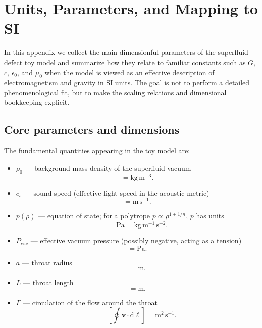 \documentclass[11pt]{article}
\newcommand{\dd}{\mathrm{d}}
\begin{document}
\section{Units, Parameters, and Mapping to SI}
\label{app:units}

In this appendix we collect the main dimensionful parameters of the superfluid defect toy model and summarize how they relate to familiar constants such as $G$, $c$, $\epsilon_0$, and $\mu_0$ when the model is viewed as an effective description of electromagnetism and gravity in SI units.  The goal is not to perform a detailed phenomenological fit, but to make the scaling relations and dimensional bookkeeping explicit.

\subsection{Core parameters and dimensions}

The fundamental quantities appearing in the toy model are:

\begin{itemize}
  \item $\rho_0$ --- background mass density of the superfluid vacuum
    \begin{equation}
    [\rho_0] = \mathrm{kg\,m^{-3}}.
    \end{equation}

  \item $c_s$ --- sound speed (effective light speed in the acoustic metric)
    \begin{equation}
    [c_s] = \mathrm{m\,s^{-1}}.
    \end{equation}

  \item $p(\rho)$ --- equation of state; for a polytrope $p \propto \rho^{1+1/n}$, $p$ has units
    \begin{equation}
    [p] = \mathrm{Pa} = \mathrm{kg\,m^{-1}\,s^{-2}}.
    \end{equation}

  \item $P_{\mathrm{vac}}$ --- effective vacuum pressure (possibly negative, acting as a tension)
    \begin{equation}
    [P_{\mathrm{vac}}] = \mathrm{Pa}.
    \end{equation}

  \item $a$ --- throat radius
    \begin{equation}
    [a] = \mathrm{m}.
    \end{equation}

  \item $L$ --- throat length
    \begin{equation}
    [L] = \mathrm{m}.
    \end{equation}

  \item $\Gamma$ --- circulation of the flow around the throat
    \begin{equation}
    [\Gamma] = [\oint \mathbf{v}\cdot\dd\boldsymbol{\ell}]
             = \mathrm{m^2\,s^{-1}}.
    \end{equation}
\end{itemize}
\end{document}
